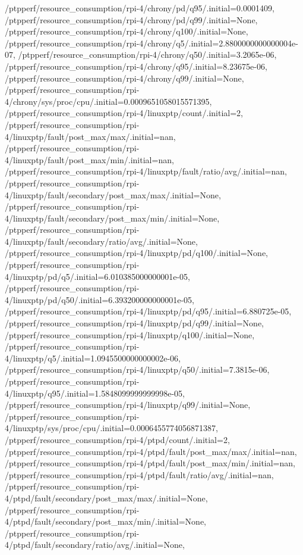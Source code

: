 {    /ptpperf/resource_consumption/rpi-4/chrony/pd/q95/.initial=0.0001409,
    /ptpperf/resource_consumption/rpi-4/chrony/pd/q99/.initial=None,
    /ptpperf/resource_consumption/rpi-4/chrony/q100/.initial=None,
    /ptpperf/resource_consumption/rpi-4/chrony/q5/.initial=2.8800000000000004e-07,
    /ptpperf/resource_consumption/rpi-4/chrony/q50/.initial=3.2065e-06,
    /ptpperf/resource_consumption/rpi-4/chrony/q95/.initial=8.23675e-06,
    /ptpperf/resource_consumption/rpi-4/chrony/q99/.initial=None,
    /ptpperf/resource_consumption/rpi-4/chrony/sys/proc/cpu/.initial=0.0009651058015571395,
    /ptpperf/resource_consumption/rpi-4/linuxptp/count/.initial=2,
    /ptpperf/resource_consumption/rpi-4/linuxptp/fault/post_max/max/.initial=nan,
    /ptpperf/resource_consumption/rpi-4/linuxptp/fault/post_max/min/.initial=nan,
    /ptpperf/resource_consumption/rpi-4/linuxptp/fault/ratio/avg/.initial=nan,
    /ptpperf/resource_consumption/rpi-4/linuxptp/fault/secondary/post_max/max/.initial=None,
    /ptpperf/resource_consumption/rpi-4/linuxptp/fault/secondary/post_max/min/.initial=None,
    /ptpperf/resource_consumption/rpi-4/linuxptp/fault/secondary/ratio/avg/.initial=None,
    /ptpperf/resource_consumption/rpi-4/linuxptp/pd/q100/.initial=None,
    /ptpperf/resource_consumption/rpi-4/linuxptp/pd/q5/.initial=6.010385000000001e-05,
    /ptpperf/resource_consumption/rpi-4/linuxptp/pd/q50/.initial=6.393200000000001e-05,
    /ptpperf/resource_consumption/rpi-4/linuxptp/pd/q95/.initial=6.880725e-05,
    /ptpperf/resource_consumption/rpi-4/linuxptp/pd/q99/.initial=None,
    /ptpperf/resource_consumption/rpi-4/linuxptp/q100/.initial=None,
    /ptpperf/resource_consumption/rpi-4/linuxptp/q5/.initial=1.0945500000000002e-06,
    /ptpperf/resource_consumption/rpi-4/linuxptp/q50/.initial=7.3815e-06,
    /ptpperf/resource_consumption/rpi-4/linuxptp/q95/.initial=1.5848099999999998e-05,
    /ptpperf/resource_consumption/rpi-4/linuxptp/q99/.initial=None,
    /ptpperf/resource_consumption/rpi-4/linuxptp/sys/proc/cpu/.initial=0.0006455774056871387,
    /ptpperf/resource_consumption/rpi-4/ptpd/count/.initial=2,
    /ptpperf/resource_consumption/rpi-4/ptpd/fault/post_max/max/.initial=nan,
    /ptpperf/resource_consumption/rpi-4/ptpd/fault/post_max/min/.initial=nan,
    /ptpperf/resource_consumption/rpi-4/ptpd/fault/ratio/avg/.initial=nan,
    /ptpperf/resource_consumption/rpi-4/ptpd/fault/secondary/post_max/max/.initial=None,
    /ptpperf/resource_consumption/rpi-4/ptpd/fault/secondary/post_max/min/.initial=None,
    /ptpperf/resource_consumption/rpi-4/ptpd/fault/secondary/ratio/avg/.initial=None,
}
